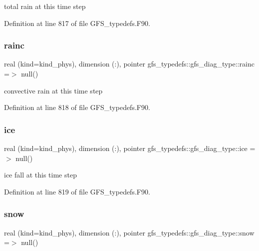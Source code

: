 total rain at this time step 



Definition at line 817 of file G\+F\+S\+\_\+typedefs.\+F90.

\mbox{\label{structgfs__typedefs_1_1gfs__diag__type_a4e3d41a849bd7768b571ee2633fe2ce8}} 
\subsubsection{rainc}
{\footnotesize\ttfamily real (kind=kind\+\_\+phys), dimension  (\+:), pointer gfs\+\_\+typedefs\+::gfs\+\_\+diag\+\_\+type\+::rainc =$>$ null()}



convective rain at this time step 



Definition at line 818 of file G\+F\+S\+\_\+typedefs.\+F90.

\mbox{\label{structgfs__typedefs_1_1gfs__diag__type_ac77947bb2825a26fc9ea29c48f022b61}} 
\subsubsection{ice}
{\footnotesize\ttfamily real (kind=kind\+\_\+phys), dimension    (\+:), pointer gfs\+\_\+typedefs\+::gfs\+\_\+diag\+\_\+type\+::ice =$>$ null()}



ice fall at this time step 



Definition at line 819 of file G\+F\+S\+\_\+typedefs.\+F90.

\mbox{\label{structgfs__typedefs_1_1gfs__diag__type_a9151716c61c481e080ad18c3cbb1ef5d}} 
\subsubsection{snow}
{\footnotesize\ttfamily real (kind=kind\+\_\+phys), dimension   (\+:), pointer gfs\+\_\+typedefs\+::gfs\+\_\+diag\+\_\+type\+::snow =$>$ null()}



